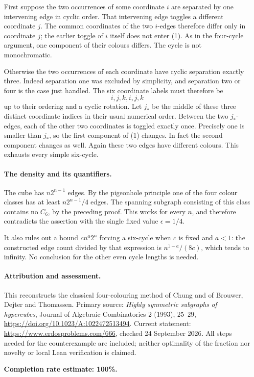 First suppose the two occurrences of some coordinate \(i\) are separated by one intervening edge in cyclic order. That intervening edge toggles a different coordinate \(j\). The common coordinates of the two \(i\)-edges therefore differ only in coordinate \(j\); the earlier toggle of \(i\) itself does not enter (1). As in the four-cycle argument, one component of their colours differs. The cycle is not monochromatic.

Otherwise the two occurrences of each coordinate have cyclic separation exactly three. Indeed separation one was excluded by simplicity, and separation two or four is the case just handled. The six coordinate labels must therefore be
\[
 i,j,k,i,j,k
\]
up to their ordering and a cyclic rotation. Let \(j_*\) be the middle of these three distinct coordinate indices in their usual numerical order. Between the two \(j_*\)-edges, each of the other two coordinates is toggled exactly once. Precisely one is smaller than \(j_*\), so the first component of (1) changes. In fact the second component changes as well. Again these two edges have different colours. This exhausts every simple six-cycle.

\paragraph{The density and its quantifiers.}
The cube has \(n2^{n-1}\) edges. By the pigeonhole principle one of the four colour classes has at least \(n2^{n-1}/4\) edges. The spanning subgraph consisting of this class contains no \(C_6\), by the preceding proof. This works for every \(n\), and therefore contradicts the assertion with the single fixed value \(\epsilon=1/4\).

It also rules out a bound \(cn^a2^n\) forcing a six-cycle when \(c\) is fixed and \(a<1\): the constructed edge count divided by that expression is \(n^{1-a}/(8c)\), which tends to infinity. No conclusion for the other even cycle lengths is needed.

\paragraph{Attribution and assessment.}
This reconstructs the classical four-colouring method of Chung and of Brouwer, Dejter and Thomassen. Primary source: \emph{Highly symmetric subgraphs of hypercubes}, Journal of Algebraic Combinatorics 2 (1993), 25--29, \url{https://doi.org/10.1023/A:1022472513494}. Current statement: \url{https://www.erdosproblems.com/666}, checked 24 September 2026. All steps needed for the counterexample are included; neither optimality of the fraction nor novelty or local Lean verification is claimed.

\textbf{Completion rate estimate: 100\%.}
